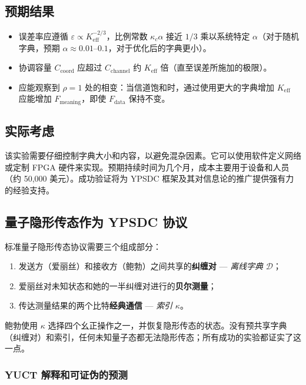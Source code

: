 \documentclass[12pt,a4paper]{article}
\theoremstyle{remark}
\newcommand{\Keff}{K_{\mathrm{eff}}}
\begin{document}
	\subsection{预期结果}
	
	\begin{itemize}
		\item 误差率应遵循 $\varepsilon \propto K_{\mathrm{eff}}^{-2/3}$，比例常数 $\kappa_c \alpha$ 接近 $1/3$ 乘以系统特定 $\alpha$（对于随机字典，预期 $\alpha \approx 0.01$–$0.1$，对于优化后的字典更小）。
		\item 协调容量 $C_{\text{coord}}$ 应超过 $C_{\text{channel}}$ 约 $\Keff$ 倍（直至误差所施加的极限）。
		\item 应能观察到 $\rho=1$ 处的相变：当信道饱和时，通过使用更大的字典增加 $\Keff$ 应能增加 $F_{\text{meaning}}$，即使 $F_{\text{data}}$ 保持不变。
	\end{itemize}
	
	\subsection{实际考虑}
	
	该实验需要仔细控制字典大小和内容，以避免混杂因素。它可以使用软件定义网络或定制 FPGA 硬件来实现。预期持续时间为几个月，成本主要用于设备和人员（约 50,000 美元）。成功验证将为 YPSDC 框架及其对信息论的推广提供强有力的经验支持。
	
	\subsection{量子隐形传态作为 YPSDC 协议}
	\label{subsec:qt}
	
	标准量子隐形传态协议需要三个组成部分：
	\begin{enumerate}
		\item 发送方（爱丽丝）和接收方（鲍勃）之间共享的\textbf{纠缠对} — \emph{离线字典} $\mathcal{D}$；
		\item 爱丽丝对未知状态和她的一半纠缠对进行的\textbf{贝尔测量}；
		\item 传达测量结果的两个比特\textbf{经典通信} — \emph{索引} $\kappa$。
	\end{enumerate}
	鲍勃使用 $\kappa$ 选择四个幺正操作之一，并恢复隐形传态的状态。没有预共享字典（纠缠对）和索引，任何未知量子态都无法隐形传态；所有成功的实验都证实了这一点。
	
	\subsubsection{YUCT 解释和可证伪的预测}
	
\end{document}

